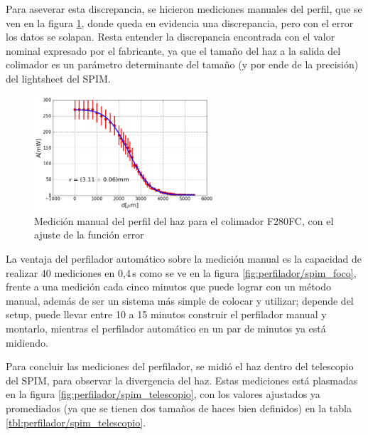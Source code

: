 Para aseverar esta discrepancia, se hicieron mediciones manuales del perfil, que se ven en la figura \ref{fig:perfilador/spim_foco_manual}, donde queda en evidencia una discrepancia, pero con el error los datos se solapan. Resta entender la discrepancia encontrada con el valor nominal expresado por el fabricante, ya que el tamaño del haz a la salida del colimador es un parámetro determinante del tamaño (y por ende de la precisión) del lightsheet del SPIM.

\begin{figure}[H]
    \centering
    \includegraphics[width=0.6\textwidth]{fig/perfilador/calibracion_f280}
    \caption{Medición manual del perfil del haz para el colimador F280FC, con el ajuste de la función error}
    \label{fig:perfilador/spim_foco_manual}
\end{figure}

La ventaja del perfilador automático sobre la medición manual es la capacidad de realizar 40 mediciones en 0,4$\,$s como se ve en la figura \ref{fig:perfilador/spim_foco}, frente a una medición cada cinco minutos que puede lograr con un método manual, además de ser un sistema más simple de colocar y utilizar; depende del setup, puede llevar entre 10 a 15 minutos construir el perfilador manual y montarlo, mientras el perfilador automático en un par de minutos ya está midiendo. 

Para concluir las mediciones del perfilador, se midió el haz dentro del telescopio del SPIM, para observar la divergencia del haz. Estas mediciones está plasmadas en la figura \ref{fig:perfilador/spim_telescopio}, con los valores ajustados ya promediados (ya que se tienen dos tamaños de haces bien definidos) en la tabla \ref{tbl:perfilador/spim_telescopio}.

